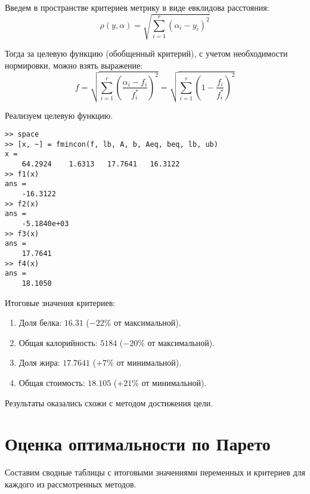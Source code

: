 Введем в пространстве критериев метрику в виде евклидова расстояния:
$$
\rho(y, \alpha) = \sqrt{\sum_{i=1}^r(\alpha_i - y_i)^2}
$$

Тогда за целевую функцию (обобщенный критерий), с учетом необходимости нормировки, можно взять выражение:
$$
f = \sqrt{ \sum_{i=1}^r \left( \frac{\alpha_i-f_i}{f_i^*} \right)^2 } 
= \sqrt{ \sum_{i=1}^r \left( 1 - \frac{f_i}{f_i^*} \right)^2 }
$$

Реализуем целевую функцию.



\begin{lstlisting}[caption=\code{Console}]
>> space
>> [x, ~] = fmincon(f, lb, A, b, Aeq, beq, lb, ub)
x =
	64.2924    1.6313   17.7641   16.3122
>> f1(x)
ans =
	-16.3122
>> f2(x)
ans =
	-5.1840e+03
>> f3(x)
ans =
	17.7641
>> f4(x)
ans =
	18.1050
\end{lstlisting}

Итоговые значения критериев:

\begin{enumerate}
	\item Доля белка: $16.31$ ($-22\%$ от максимальной).
	\item Общая калорийность: $5184$ ($-20\%$ от максимальной).
	\item Доля жира: $17.7641$ ($+7\%$ от минимальной).
	\item Общая стоимость: $18.105$ ($+21\%$ от минимальной).
\end{enumerate}

Результаты оказались схожи с методом достижения цели.

\section{Оценка оптимальности по Парето}

Составим сводные таблицы с итоговыми значениями переменных и критериев для каждого из рассмотренных методов.

